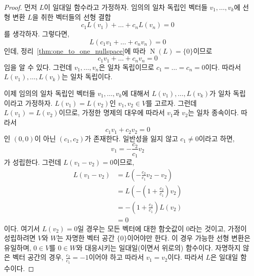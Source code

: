 \documentclass[unfonts,oneside,a4paper]{oblivoir}
\theoremstyle{definition}
\theoremstyle{theorem}
\theoremstyle{remark}
\theoremstyle{remark}
\theoremstyle{remark}
\theoremstyle{remark}
\renewcommand{\vec}[1]{\bm{\mathit{#1}}}
\newcommand{\vecz}{\bm{\mathrm{0}}}
\DeclareMathOperator{\Null}{N}
\begin{document}
\begin{proof}
    먼저 $L$이 일대일 함수라고 가정하자.
    임의의 일차 독립인 벡터들 $\vec v_1, \dots, \vec v_k$에 선형 변환 $L$을 취한 벡터들의 선형 결합
    \begin{equation*}
        c_1 L(\vec v_1) + \dots + c_n L(\vec v_n) = \vecz
    \end{equation*}
    를 생각하자.
    그렇다면,
    \begin{equation*}
        L(c_1 \vec v_1 + \dots + c_n \vec v_n) = \vecz
    \end{equation*}
    인데, 정리~\ref{thm:one_to_one_nullspace}에 따라 $\Null(L) = \{\vecz\}$이므로
    \begin{equation*}
        c_1 \vec v_1 + \dots + c_n \vec v_n = \vecz
    \end{equation*}
    임을 알 수 있다.
    그런데 $\vec v_1, \dots, \vec v_n$은 일차 독립이므로 $c_1 = \dots = c_n = 0$이다.
    따라서 $L(\vec v_1), \dots, L(\vec v_k)$는 일차 독립이다.

    이제 임의의 일차 독립인 벡터들 $\vec v_1, \dots, \vec v_k$에 대해서 $L(\vec v_1), \dots, L(\vec v_k)$가 일차 독립이라고 가정하자.
    $L(\vec v_1) = L(\vec v_2)$인 $\vec v_1, \vec v_2 \in V$를 고르자.
    그런데 $L(\vec v_1) = L(\vec v_2)$이므로, 가정한 명제의 대우에 따라서 $\vec v_1$과 $\vec v_2$는 일차 종속이다.
    따라서
    \begin{equation*}
        c_1 \vec v_1 + c_2 \vec v_2 = \vecz
    \end{equation*}
    인 $(0, 0)$이 아닌 $(c_1, c_2)$가 존재한다.
    일반성을 잃지 않고 $c_1 \neq 0$이라고 하면,
    \begin{equation*}
        \vec v_1 = - \frac{c_2}{c_1} \vec v_2
    \end{equation*}
    가 성립한다.
    그런데 $L(\vec v_1 - \vec v_2) = \vecz$이므로,
    \begin{align*}
        L(\vec v_1 - \vec v_2) &= L\left(-\frac{c_2}{c_1} \vec v_2 - \vec v_2\right)\\
                             &= L\left(-\left(1 + \frac{c_2}{c_1}\right) \vec v_2\right)\\
                             &= -\left(1 + \frac{c_2}{c_1}\right) L(\vec v_2)\\
                             &= \vecz
    \end{align*}
    이다.
    여기서 $L(\vec v_2) = \vecz$일 경우는 모든 벡터에 대한 함숫값이 $\vecz$라는 것이고, 가정이 성립하려면 $V$와 $W$는 자명한 벡터 공간 $\{\vecz\}$이어야만 한다.
    이 경우 가능한 선형 변환은 유일하며, $\vecz \in V$를 $\vecz \in W$와 대응시키는 일대일(이면서 위로의) 함수이다.
    자명하지 않은 벡터 공간의 경우, $\frac{c_2}{c_1} = -1$이어야 하고 따라서 $\vec v_1 = \vec v_2$이다.
    따라서 $L$은 일대일 함수이다.
\end{proof}
\end{document}
